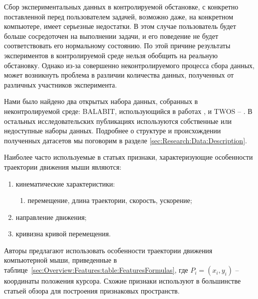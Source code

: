 \documentclass[12pt]{article}
\begin{document}
    \par Сбор экспериментальных данных в контролируемой обстановке, с конкретно поставленной перед пользователем задачей, возможно даже, на конкретном компьютере, имеет серьезные недостатки. В этом случае пользователь будет больше сосредоточен на выполнении задачи, и его поведение не будет соответствовать его нормальному состоянию. По этой причине результаты экспериментов в контролируемой среде нельзя обобщить на реальную обстановку. Однако из-за совершенно неконтролируемого процесса сбора данных, может возникнуть проблема в различии количества данных, полученных от различных участников эксперимента.

    \par Нами было найдено два открытых набора данных, собранных в неконтролируемой среде: BALABIT, использующийся в работах \cite{Antal, Tan, Chong, Chong2D}, и TWOS -- \cite{Tan, Chong, Chong2D}. В остальных исследовательских публикациях используются собственные или недоступные наборы данных. Подробнее о структуре и происхождении полученных датасетов мы поговорим в разделе \ref{sec:Research:Data:Description}.

    \par Наиболее часто используемые в статьях признаки, характеризующие особенности траектории движения мыши являются:

    \begin{enumerate}
        \item кинематические характеристики:
        \begin{enumerate}
            \item перемещение, длина траектории, скорость, ускорение;
        \end{enumerate}
        \item направление движения;
        \item кривизна кривой перемещения.
    \end{enumerate}
    \vspace{10mm}

    \par Авторы \cite{Mondal} предлагают использовать особенности траектории движения компьютерной мыши, приведенные в таблице~\ref{sec:Overview:Features:table:FeaturesFormulas}, где $P_i = (x_i, y_i)$ -- координаты положения курсора. Схожие признаки используют в большинстве статьей обзора для построения признаковых пространств.
\end{document}
